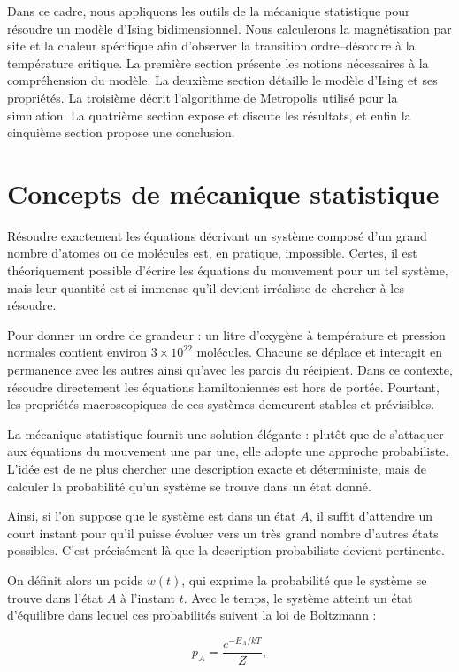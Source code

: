 \documentclass[a4paper,11pt]{article}
\begin{document}
Dans ce cadre, nous appliquons les outils de la mécanique statistique pour résoudre un modèle d’Ising bidimensionnel. Nous calculerons la magnétisation par site et la chaleur spécifique afin d’observer la transition ordre–désordre à la température critique. La première section présente les notions nécessaires à la compréhension du modèle. La deuxième section détaille le modèle d’Ising et ses propriétés. La troisième décrit l’algorithme de Metropolis utilisé pour la simulation. La quatrième section expose et discute les résultats, et enfin la cinquième section propose une conclusion.

\section{Concepts de mécanique statistique}
Résoudre exactement les équations décrivant un système composé d’un grand nombre d’atomes ou de molécules est, en pratique, impossible. Certes, il est théoriquement possible d’écrire les équations du mouvement pour un tel système, mais leur quantité est si immense qu’il devient irréaliste de chercher à les résoudre.  

Pour donner un ordre de grandeur : un litre d’oxygène à température et pression normales contient environ $3 \times 10^{22}$ molécules. Chacune se déplace et interagit en permanence avec les autres ainsi qu’avec les parois du récipient. Dans ce contexte, résoudre directement les équations hamiltoniennes est hors de portée. Pourtant, les propriétés macroscopiques de ces systèmes demeurent stables et prévisibles.  

La mécanique statistique fournit une solution élégante : plutôt que de s’attaquer aux équations du mouvement une par une, elle adopte une approche probabiliste. L’idée est de ne plus chercher une description exacte et déterministe, mais de calculer la probabilité qu’un système se trouve dans un état donné.  

Ainsi, si l’on suppose que le système est dans un état $A$, il suffit d’attendre un court instant pour qu’il puisse évoluer vers un très grand nombre d’autres états possibles. C’est précisément là que la description probabiliste devient pertinente.  

On définit alors un poids $w(t)$, qui exprime la probabilité que le système se trouve dans l’état $A$ à l’instant $t$. Avec le temps, le système atteint un état d’équilibre dans lequel ces probabilités suivent la loi de Boltzmann :  

\begin{equation}
p_A = \frac{e^{-E_A/kT}}{Z},
\end{equation}
\end{document}

